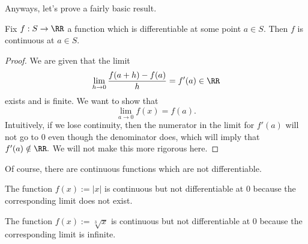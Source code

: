 Anyways, let's prove a fairly basic result.
\begin{proposition}
	Fix $f:S\to\RR$ a function which is differentiable at some point $a\in S.$ Then $f$ is continuous at $a\in S.$
\end{proposition}
\begin{proof}
	We are given that the limit
	\[\lim_{h\to0}\frac{f(a+h)-f(a)}h=f'(a)\in\RR\]
	exists and is finite. We want to show that
	\[\lim_{a\to0}f(x)=f(a).\]
	Intuitively, if we lose continuity, then the numerator in the limit for $f'(a)$ will not go to $0$ even though the denominator does, which will imply that $f'(a)\notin\RR.$ We will not make this more rigorous here.
\end{proof}
Of course, there are continuous functions which are not differentiable.
\begin{example}
	The function $f(x):=|x|$ is continuous but not differentiable at $0$ because the corresponding limit does not exist.
\end{example}
\begin{example}
	The function $f(x):=\sqrt[3]x$ is continuous but not differentiable at $0$ because the corresponding limit is infinite.
\end{example}


